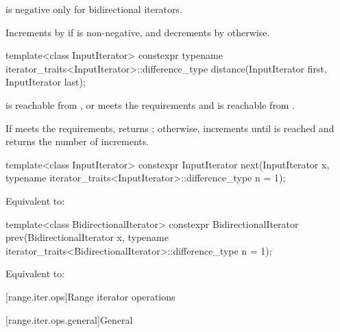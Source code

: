 \begin{itemdescr}
\pnum
\expects
{}
is negative only for bidirectional iterators.

\pnum
\effects
Increments  by  if  is non-negative, and
decrements  by  otherwise.
\end{itemdescr}

%
\begin{itemdecl}
template<class InputIterator>
  constexpr typename iterator_traits<InputIterator>::difference_type
    distance(InputIterator first, InputIterator last);
\end{itemdecl}

\begin{itemdescr}
\pnum
\expects
{} is reachable from , or
 meets
the  requirements and
 is reachable from .

\pnum
\effects
If  meets the  requirements,
returns ; otherwise, increments
 until  is reached and returns
the number of increments.
\end{itemdescr}

%
\begin{itemdecl}
template<class InputIterator>
  constexpr InputIterator next(InputIterator x,
    typename iterator_traits<InputIterator>::difference_type n = 1);
\end{itemdecl}

\begin{itemdescr}
\pnum
\effects
Equivalent to: 
\end{itemdescr}

%
\begin{itemdecl}
template<class BidirectionalIterator>
  constexpr BidirectionalIterator prev(BidirectionalIterator x,
    typename iterator_traits<BidirectionalIterator>::difference_type n = 1);
\end{itemdecl}

\begin{itemdescr}
\pnum
\effects
Equivalent to: 
\end{itemdescr}

[range.iter.ops]{Range iterator operations}

[range.iter.ops.general]{General}

